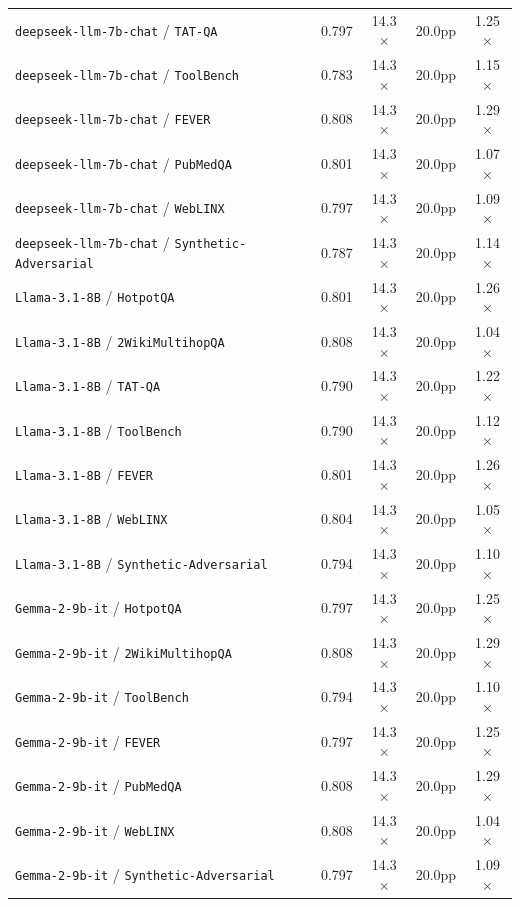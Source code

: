 \begin{longtable}{lcccc}
\texttt{deepseek-llm-7b-chat} / \texttt{TAT-QA} & 0.797 & 14.3$\times$ & 20.0pp & 1.25$\times$ \\
\texttt{deepseek-llm-7b-chat} / \texttt{ToolBench} & 0.783 & 14.3$\times$ & 20.0pp & 1.15$\times$ \\
\texttt{deepseek-llm-7b-chat} / \texttt{FEVER} & 0.808 & 14.3$\times$ & 20.0pp & 1.29$\times$ \\
\texttt{deepseek-llm-7b-chat} / \texttt{PubMedQA} & 0.801 & 14.3$\times$ & 20.0pp & 1.07$\times$ \\
\texttt{deepseek-llm-7b-chat} / \texttt{WebLINX} & 0.797 & 14.3$\times$ & 20.0pp & 1.09$\times$ \\
\texttt{deepseek-llm-7b-chat} / \texttt{Synthetic-Adversarial} & 0.787 & 14.3$\times$ & 20.0pp & 1.14$\times$ \\
\texttt{Llama-3.1-8B} / \texttt{HotpotQA} & 0.801 & 14.3$\times$ & 20.0pp & 1.26$\times$ \\
\texttt{Llama-3.1-8B} / \texttt{2WikiMultihopQA} & 0.808 & 14.3$\times$ & 20.0pp & 1.04$\times$ \\
\texttt{Llama-3.1-8B} / \texttt{TAT-QA} & 0.790 & 14.3$\times$ & 20.0pp & 1.22$\times$ \\
\texttt{Llama-3.1-8B} / \texttt{ToolBench} & 0.790 & 14.3$\times$ & 20.0pp & 1.12$\times$ \\
\texttt{Llama-3.1-8B} / \texttt{FEVER} & 0.801 & 14.3$\times$ & 20.0pp & 1.26$\times$ \\
\texttt{Llama-3.1-8B} / \texttt{WebLINX} & 0.804 & 14.3$\times$ & 20.0pp & 1.05$\times$ \\
\texttt{Llama-3.1-8B} / \texttt{Synthetic-Adversarial} & 0.794 & 14.3$\times$ & 20.0pp & 1.10$\times$ \\
\texttt{Gemma-2-9b-it} / \texttt{HotpotQA} & 0.797 & 14.3$\times$ & 20.0pp & 1.25$\times$ \\
\texttt{Gemma-2-9b-it} / \texttt{2WikiMultihopQA} & 0.808 & 14.3$\times$ & 20.0pp & 1.29$\times$ \\
\texttt{Gemma-2-9b-it} / \texttt{ToolBench} & 0.794 & 14.3$\times$ & 20.0pp & 1.10$\times$ \\
\texttt{Gemma-2-9b-it} / \texttt{FEVER} & 0.797 & 14.3$\times$ & 20.0pp & 1.25$\times$ \\
\texttt{Gemma-2-9b-it} / \texttt{PubMedQA} & 0.808 & 14.3$\times$ & 20.0pp & 1.29$\times$ \\
\texttt{Gemma-2-9b-it} / \texttt{WebLINX} & 0.808 & 14.3$\times$ & 20.0pp & 1.04$\times$ \\
\texttt{Gemma-2-9b-it} / \texttt{Synthetic-Adversarial} & 0.797 & 14.3$\times$ & 20.0pp & 1.09$\times$ \\

\end{longtable}
